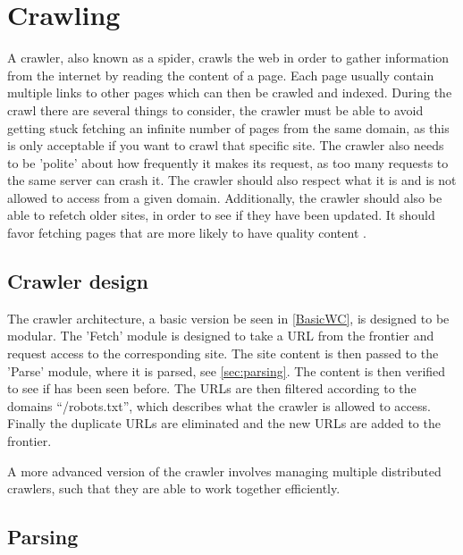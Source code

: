 \chapter{Crawling}

A crawler, also known as a spider, crawls the web in order to gather
information from the internet by reading the content of a page. Each page
usually contain multiple links to other pages which can then be crawled and
indexed. During the crawl there are several things to consider, the crawler
must be able to avoid getting stuck fetching an infinite number of pages from
the same domain, as this is only acceptable if you want to crawl that specific
site. The crawler also needs to be 'polite' about how frequently it makes its
request, as too many requests to the same server can crash it. The crawler
should also respect what it is and is not allowed to access from a given
domain. Additionally, the crawler should also be able to refetch older sites,
in order to see if they have been updated. It should favor fetching pages that
are more likely to have quality content
\citep[Ch. 20.1]{manning2008introduction}.\nl

\section{Crawler design}
The crawler architecture, a basic version be seen in \autoref{BasicWC}, is
designed to be modular. The 'Fetch' module is designed to take a URL from the
frontier and request access to the corresponding site. The site content is then
passed to the 'Parse' module, where it is parsed, see \autoref{sec:parsing}.
The content is then verified to see if has been seen before. The URLs are then
filtered according to the domains ``/robots.txt'', which describes what the
crawler is allowed to access. Finally the duplicate URLs are eliminated and the
new URLs are added to the frontier.


A more advanced version of the crawler involves managing multiple distributed
crawlers, such that they are able to work together efficiently.

\section{Parsing} \label{sec:parsing}


